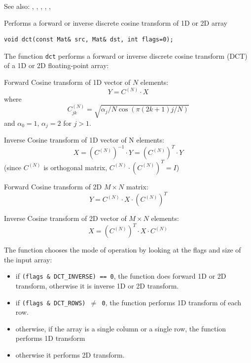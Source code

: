 See also: , , , , , 


\label{dct}
Performs a forward or inverse discrete cosine transform of 1D or 2D array

\begin{lstlisting}
void dct(const Mat& src, Mat& dst, int flags=0);
\end{lstlisting}
\begin{description}
\end{description}

The function \texttt{dct} performs a forward or inverse discrete cosine transform (DCT) of a 1D or 2D floating-point array:

Forward Cosine transform of 1D vector of $N$ elements:
\[Y = C^{(N)} \cdot X\]
where
\[C^{(N)}_{jk}=\sqrt{\alpha_j/N\cos(\pi(2k+1)j/N)}\]
and $\alpha_0=1$, $\alpha_j=2$ for $j > 1$.

Inverse Cosine transform of 1D vector of N elements:
\[X = (C^{(N)})^{-1} \cdot Y = (C^{(N)})^T \cdot Y\]
(since $C^{(N)}$ is orthogonal matrix, $C^{(N)} \cdot (C^{(N)})^T = I$)

Forward Cosine transform of 2D $M \times N$ matrix:
\[Y = C^{(N)} \cdot X \cdot (C^{(N)})^T\]

Inverse Cosine transform of 2D vector of $M \times N$ elements:
\[X = (C^{(N)})^T \cdot X \cdot C^{(N)}\]

The function chooses the mode of operation by looking at the flags and size of the input array:
\begin{itemize}
    \item if \texttt{(flags \& DCT\_INVERSE) == 0}, the function does forward 1D or 2D transform, otherwise it is inverse 1D or 2D transform.
    \item if \texttt{(flags \& DCT\_ROWS) $\ne$ 0}, the function performs 1D transform of each row.
    \item otherwise, if the array is a single column or a single row, the function performs 1D transform
    \item otherwise it performs 2D transform.
\end{itemize}

